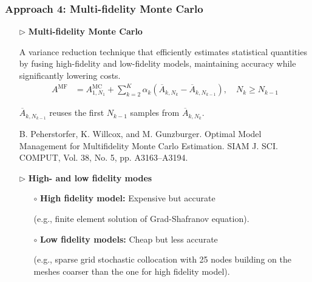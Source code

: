 \documentclass{beamer}
\begin{document}
\begin{frame}[t]
    \frametitle{Approach 4: Multi-fidelity Monte Carlo}
\begin{itemize}[leftmargin=5pt] 
\item[$\triangleright$] \textcolor{myblue3}{\bf Multi-fidelity Monte Carlo} 

{\footnotesize A variance reduction technique that efficiently estimates statistical quantities by fusing high-fidelity and low-fidelity models, maintaining accuracy while significantly lowering costs.}
%
\vspace{-2mm}
{\fontsize{7}{7}\selectfont 
\begin{align*}
A^{\text{MF}} &= A^{\text{MC}}_{1,N_1} + \sum_{k=2}^K \alpha_k\left(\overline{A}_{k,N_k} - \overline{A}_{k,N_{k-1}} \right), \quad N_k\ge N_{k-1}
\end{align*}
}
\vspace{-5mm}

{\footnotesize 
$\overline{A}_{k,N_{k-1}}$ reuses the first $N_{k-1}$ samples from $\overline{A}_{k,N_{k}}$.
}

\vspace{2mm}
%
{\fontsize{7}{7}\selectfont \textcolor{mygray2}{B. Peherstorfer, K. Willcox, and M. Gunzburger. Optimal Model Management for Multifidelity Monte Carlo Estimation. SIAM J. SCI. COMPUT, Vol. 38, No. 5, pp. A3163–A3194.}\par}
%

\item[$\triangleright$] \textcolor{myblue3}{\bf High- and low fidelity modes} 

{\footnotesize 
\begin{itemize}[leftmargin=5pt] 
     \item[$\circ$] {\bf High fidelity model:} Expensive but accurate 
     
     (e.g., finite element solution of Grad-Shafranov equation).
     \item[$\circ$] {\bf Low fidelity models:} Cheap but less accurate 
     
     (e.g., sparse grid stochastic collocation with 25 nodes building on the meshes coarser than the one for high fidelity model).
\end{itemize}
 }

\end{itemize}
\end{frame}
\end{document}
